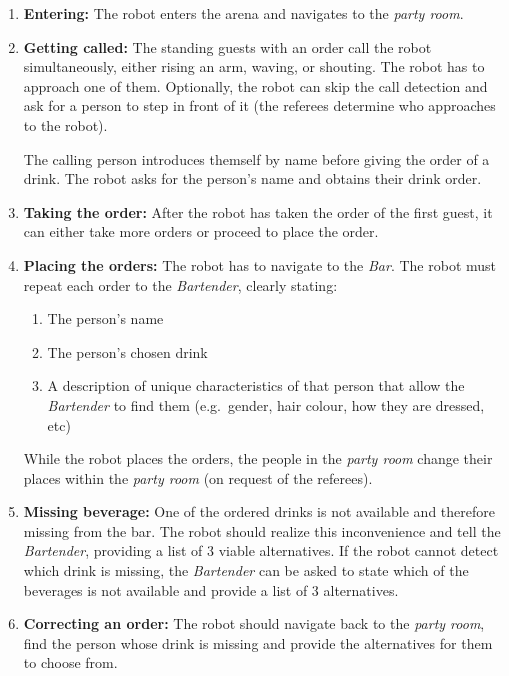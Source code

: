 \begin{enumerate}

	\item \textbf{Entering:} The robot enters the arena and navigates to the \textit{party room}.
	\item \textbf{Getting called:} The standing guests with an order call the robot simultaneously, either rising an arm, waving, or shouting. The robot has to approach one of them.
        Optionally, the robot can skip the call detection and ask for a person to step in front of it (the referees determine who approaches to the robot).

	The calling person introduces themself by name before giving the order of a drink.
	The robot asks for the person's name and obtains their drink order. \\


	\item \textbf{Taking the order:} After the robot has taken the order of the first guest, it can either take more orders or proceed to place the order.

	\item \textbf{Placing the orders:} The robot has to navigate to the \textit{Bar}. The robot must repeat each order to the \textit{Bartender}, clearly stating:
	\begin{enumerate}
		\item The person's name
		\item The person's chosen drink
		\item A description of unique characteristics of that person that allow the \textit{Bartender} to find them (e.g.~gender, hair colour, how they are dressed, etc)
	\end{enumerate}

	While the robot places the orders, the people in the \textit{party room} change their places within the \textit{party room} (on request of the referees).

	  \item \textbf{Missing beverage:} One of the ordered drinks is not available and therefore missing from the bar.
	The robot should realize this inconvenience and tell the \textit{Bartender}, providing a list of 3 viable alternatives.
	If the robot cannot detect which drink is missing, the \textit{Bartender} can be asked to state which of the beverages is not available and provide a list of 3 alternatives.

	\item \textbf{Correcting an order:} The robot should navigate back to the \textit{party room}, find the person whose drink is missing and provide the alternatives for them to choose from.\\


\end{enumerate}
